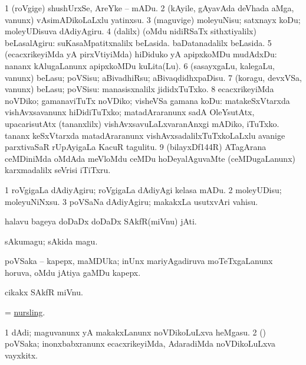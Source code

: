 \bentry
{}
\gl{\sakirx}
\bmng
\bnum
\num{1} (roVgige) shushUrxSe, AreYke -- mADu. 
\num{2} (kAyile, gAyavAda deVhada aMga, \mo vanunx) vAsimADikoLaLxlu yatinxsu. 
\num{3} (maguvige) moleyuNisu; satxnayx koDu; moleyUDisuva dAdiyAgiru. 
\num{4} (\kaparx dalilx) (oMdu nidiRSaTx sithxtiyalilx) beLasalAgiru:  suKasaMpatitxnalilx beLasida.  baDatanadalilx beLasida. 
\num{5} (ecacxrikeyiMda yA pirxVtiyiMda) hiDiduko yA apipxkoMDu mudAdxDu:  nananx kAlugaLanunx apipxkoMDu kuLita(Lu). 
\num{6} (sasayxgaLu, kalegaLu, \mo vanunx) beLasu; poVSisu; aBivadhiRsu; aBivaqdidhxpaDisu. 
\num{7} (koragu, devxVSa, \mo vanunx) beLasu; poVSisu:  manasisxnalilx jididxTuTxko. 
\num{8} ecacxrikeyiMda noVDiko; gamanaviTuTx noVDiko; visheVSa gamana koDu:  matakeSxVtarxda vishAvxsavanunx hiDidiTuTxko; matadAraranunx sadA OleYsutAtx, upacarisutAtx (tananxlilx) vishAvxsavuLaLxvaranAnxgi mADiko, iTuTxko.  tananx keSxVtarxda matadAraranunx vishAvxsadalilxTuTxkoLaLxlu avanige parxtivaSaR  rUpAyigaLa KacuR tagulitu. 
\num{9} (bilayxDf\char144R) ATagArana ceMDiniMda oMdAda meVloMdu ceMDu hoDeyalAguvaMte (ceMDugaLanunx) karxmadalilx seVrisi iTiTxru. 
\enum
\emng

\noindent
\gl{\akirx}
\expl{}
\bmng
\bnum
\num{1} roVgigaLa dAdiyAgiru; roVgigaLa dAdiyAgi kelasa mADu. 
\num{2} moleyUDisu; moleyuNiNxsu. 
\num{3} poVSaNa dAdiyAgiru; makakxLa usutxvAri vahisu. 
\enum
\emng
\eentry

\bentry
{}
\gl{\nA}
\bmng
halavu bageya doDaDx doDaDx SAkfR(miVnu) jAti. 
\emng
\eentry

\bentry
{}
\gl{\nA}
\bmng
sAkumagu; sAkida magu. 
\emng
\eentry

\bentry
{}
\gl{\nA}
\bmng
poVSaka -- kapepx, maMDUka; inUnx mariyAgadiruva moTeTxgaLanunx horuva, oMdu jAtiya gaMDu kapepx. 
\emng
\eentry

\bentry
{}
\gl{\nA}
\bmng
cikakx SAkfR miVnu. 
\emng
\eentry

\bentry
{}
\gl{\nA}
\bmng
= \hyperlink{nursling}{nursling}. 
\emng
\eentry

\bentry
{}
\gl{\nA}
\bmng
\bnum
\num{1} dAdi; maguvanunx yA makakxLanunx noVDikoLuLxva heMgasu. 
\num{2} (\rUpa) poVSaka; inonxbabxranunx ecacxrikeyiMda, AdaradiMda noVDikoLuLxva vayxkitx. 
\enum
\emng
\eentry

